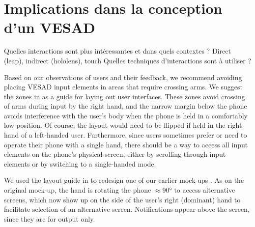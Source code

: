 


\section{Implications dans la conception d'un VESAD}
\label{sec:discussion_consequences}

Quelles interactions sont plus intéressantes et dans quels contextes ? Direct (leap), indirect (hololens), touch
Quelles techniques d'interactions sont à utiliser ?

Based on our observations of users and their feedback, we recommend avoiding placing VESAD input elements in areas that require crossing arms. We suggest the zones in  as a guide for laying out user interfaces. These zones avoid crossing of arms during input by the right hand, and the narrow margin below the phone avoids interference with the user's body when the phone is held in a comfortably low position. Of course, the layout would need to be flipped if held in the right hand of a left-handed user. Furthermore, since users sometimes prefer or need to operate their phone with a single hand, there should be a way to access all input elements on the phone's physical screen, either by scrolling through input elements or by switching to a single-handed mode.


We used the layout guide in  to redesign one of our earlier mock-ups . As on the original mock-up, the hand is rotating the phone $\approx$\ang{90} to access alternative screens, which now show up on the side of the user's right (dominant) hand to facilitate selection of an alternative screen. Notifications appear above the screen, since they are for output only.


